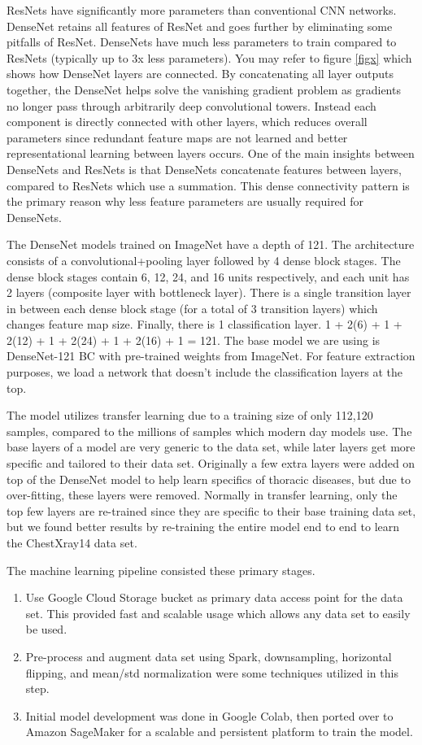 \documentclass{amia}
\begin{document}
ResNets have significantly more parameters than conventional CNN networks. DenseNet retains all features of ResNet and goes further by eliminating some pitfalls of ResNet. DenseNets have much less parameters to train compared to ResNets (typically up to 3x less parameters). You may refer to figure \ref{figx} which shows how DenseNet layers are connected. By concatenating all layer outputs together, the DenseNet helps solve the vanishing gradient problem as gradients no longer pass through arbitrarily deep convolutional towers. Instead each component is directly connected with other layers, which reduces overall parameters since redundant feature maps are not learned and better representational learning between layers occurs. One of the main insights between DenseNets and ResNets is that DenseNets concatenate features between layers, compared to ResNets which use a summation. This dense connectivity pattern is the primary reason why less feature parameters are usually required for DenseNets.

The DenseNet models trained on ImageNet have a depth of 121. The architecture consists of a convolutional+pooling layer followed by 4 dense block stages. The dense block stages contain 6, 12, 24, and 16 units respectively, and each unit has 2 layers (composite layer with bottleneck layer). There is a single transition layer in between each dense block stage (for a total of 3 transition layers) which changes feature map size. Finally, there is 1 classification layer. 1 + 2(6) + 1 + 2(12) + 1 + 2(24) + 1 + 2(16) + 1 = 121. The base model we are using is DenseNet-121 BC with pre-trained weights from ImageNet. For feature extraction purposes, we load a network that doesn't include the classification layers at the top.

The model utilizes transfer learning due to a training size of only 112,120 samples, compared to the millions of samples which modern day models use. The base layers of a model are very generic to the data set, while later layers get more specific and tailored to their data set. Originally a few extra layers were added on top of the DenseNet model to help learn specifics of thoracic diseases, but due to over-fitting, these layers were removed. Normally in transfer learning, only the top few layers are re-trained since they are specific to their base training data set, but we found better results by re-training the entire model end to end to learn the ChestXray14 data set.

The machine learning pipeline consisted these primary stages.
\begin{enumerate}
  \item Use Google Cloud Storage bucket as primary data access point for the data set. This provided fast and scalable usage which allows any data set to easily be used.
  \item Pre-process and augment data set using Spark, downsampling, horizontal flipping, and mean/std normalization were some techniques utilized in this step.
  \item Initial model development was done in Google Colab, then ported over to Amazon SageMaker for a scalable and persistent platform to train the model.
\end{enumerate}
\end{document}
